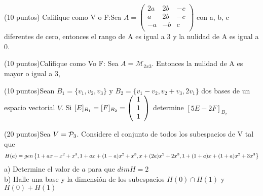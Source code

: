 \begin{enumerate}
\newpage
\begin{prob}
(10 puntos) Califique como V o F:Sea $A=\left(\begin{matrix}
2a&2b&-c\\
a&2b&-c\\
-a&-b&c\\
\end{matrix}\right)$ con a, b, c diferentes de cero, entonces el rango de A es igual a 3 y la nulidad de A es igual a 0.
\end{prob}

\newpage

\begin{prob}
(10 puntos)Califique como Vo F: Sea $A=\mathcal{M}_{2x3}$. Entonces la nulidad de A es mayor o igual a 3,
\end{prob}

\newpage
\begin{prob}
(10 puntos)Sean $B_1=\{v_1, v_2, v_3\}$ y $B_2=\{v_1-v_2, v_2+v_3, 2v_1\}$ dos bases de un espacio vectorial $V$. Si $[E]_{B_1}=[F]_{B_2}=\left( \begin{array}{r} 1\\ 1\\ 1 \end{array} \right) $ determine $[5E-2F]_{B_2}$
\end{prob}

\newpage
\begin{prob}
(20 puntos)Sea $V=\mathcal{P}_3$. Considere el conjunto de todos los subespacios de V tal que $$H(a)=gen \left\{1+ax+x^2+x^3, 1+ax+(1-a)x^2+x^3, x+(2a)x^2+2x^3, 1+(1+a)x+(1+a)x^2+3x^3 \right\} $$
a) Determine el valor de $a$ para que $dimH=2$ \\
b) Halle una base y la dimensión de los subespacios $H(0)\cap H(1)$ y $H(0)+ H(1)$
\end{prob}


\newpage

\newpage



\end{enumerate}

